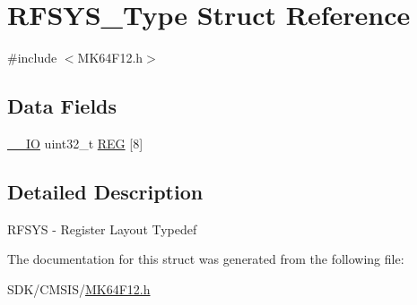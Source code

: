 \hypertarget{struct_r_f_s_y_s___type}{}\section{R\+F\+S\+Y\+S\+\_\+\+Type Struct Reference}
\label{struct_r_f_s_y_s___type}


{\ttfamily \#include $<$M\+K64\+F12.\+h$>$}

\subsection*{Data Fields}
\begin{DoxyCompactItemize}
\item 
\mbox{\hyperlink{core__cm4_8h_aec43007d9998a0a0e01faede4133d6be}{\+\_\+\+\_\+\+IO}} uint32\+\_\+t \mbox{\hyperlink{group___v_r_e_f___peripheral___access___layer_gad1d411f494430b8bfb7e89e78efd49be}{R\+EG}} \mbox{[}8\mbox{]}
\end{DoxyCompactItemize}


\subsection{Detailed Description}
R\+F\+S\+YS -\/ Register Layout Typedef 

The documentation for this struct was generated from the following file\+:\begin{DoxyCompactItemize}
\item 
S\+D\+K/\+C\+M\+S\+I\+S/\mbox{\hyperlink{_m_k64_f12_8h}{M\+K64\+F12.\+h}}\end{DoxyCompactItemize}
